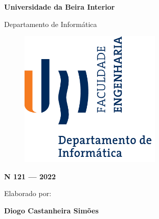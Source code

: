 \thispagestyle{empty}
\setcounter{page}{-1}

\begin{center}
\begin{Huge}
\textbf{Universidade da Beira Interior}
\end{Huge}
\end{center}

\begin{center}
\begin{Huge}
Departamento de Informática
\end{Huge}
\end{center}

\vspace{0.07cm}
\begin{figure}[!htb]
\centering
\includegraphics[width=191pt]{ubi-fe-di.png}
\end{figure}

\vspace{\vspacepre}
\begin{center}
\begin{Large}
\textbf{N\textordmasculine{} 121 --- 2022}\\
\textbf{\emph{\theappdescription}}
\end{Large}
\end{center}


\vspace{\vspacepre}
\begin{center}
\begin{normalsize}
\begin{large}
Elaborado por:
\end{large}
\end{normalsize}
\end{center}

\vspace{\vspaceinner}
\begin{center}
\begin{large}
\textbf{Diogo Castanheira Simões}
\end{large}
\end{center}

